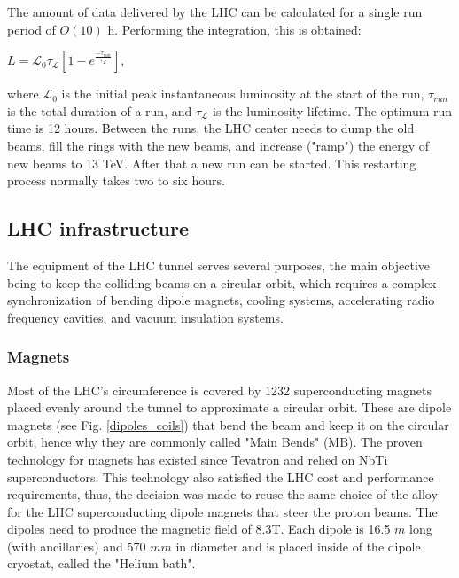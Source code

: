 \begin{normalsize}
The amount of data delivered by the LHC can be calculated for a single run period of $O(10)$ h. Performing the integration, this is obtained: 

 $L = \mathcal{L}_0 \tau_\mathcal{L}  \left[  1- e^{\frac{-\tau_{run}}{\tau_\mathcal{L} }}  \right]$, 

\noindent where $\mathcal{L}_0$ is the initial peak instantaneous luminosity at the start of the run, $\tau_{run}$ is the total duration of a run, and $\tau_\mathcal{L}$ is the luminosity lifetime. The optimum run time is 12 hours. Between the runs, the LHC center needs to dump the old beams, fill the rings with the new beams, and increase ("ramp") the energy of new beams to 13 TeV. After that a new run can be started. This restarting process normally takes two to six hours.



\subsection{LHC infrastructure}

The equipment of the LHC tunnel serves several purposes,  the main objective being to keep the colliding beams on a circular orbit, which requires a complex synchronization of bending dipole magnets, cooling systems, accelerating radio frequency cavities, and vacuum insulation systems.



\subsubsection{Magnets}\label{sec:magnets}

Most of the LHC's circumference is covered by 1232 superconducting magnets placed evenly around the tunnel to approximate a circular orbit. These are dipole magnets (see Fig. \ref{dipoles_coils}) that bend the beam and keep it on the circular orbit, hence why they are commonly called "Main Bends" (MB). The proven technology for magnets has existed since Tevatron and relied on NbTi superconductors. This technology also satisfied the LHC cost and performance requirements, thus, the decision was made to reuse the same choice of the alloy for the LHC superconducting dipole magnets that steer the proton beams. The dipoles need to produce the magnetic field of 8.3T. %
Each dipole is 16.5 $m$ long (with ancillaries) and 570 $mm$ in diameter and is placed inside of the dipole cryostat, called the "Helium bath". 


\end{normalsize}

